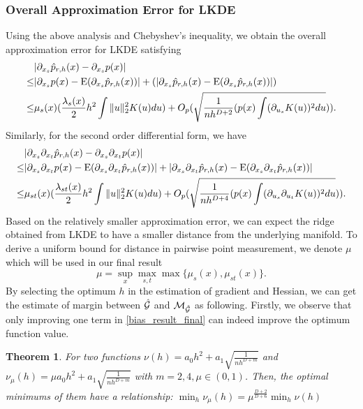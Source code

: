 \documentclass[aos,preprint]{imsart}
\newtheorem{theorem}{Theorem}[section]
\theoremstyle{remark}
\begin{document}
\subsubsection{Overall Approximation Error for LKDE}
Using the above analysis and Chebyshev's inequality, we obtain the overall approximation error for LKDE satisfying
\begin{equation}\label{bias_result_final}
\begin{aligned}
 &|\partial_{x_s} \hat{p}_{r,h}(x)-\partial_{x_s} p(x)|\\
 \leq & |\partial_{x_s} p(x) - {\rm E} (\partial_{x_s}\hat{p}_{r,h}(x)) |+(|\partial_{x_s} \hat{p}_{r,h}(x) - {\rm E} (\partial_{x_s}\hat{p}_{r,h}(x)) | )\\
 \leq & \mu_s(x)( \frac{ \lambda_s(x)}{2} h^2 \int \|u\|_2^2 K(u) du) + O_p(\sqrt{\frac{1}{n h^{D+2}}  (p(x) \int (\partial_{ u_s } K (u) )^2   du})).
\end{aligned}
\end{equation}
Similarly, for the second order differential form, we have
\[
\begin{aligned}
 &|\partial_{x_{s}}\partial_{x_t} \hat{p}_{r,h}(x)-\partial_{x_{s}}\partial_{x_t} p(x)|\\
 \leq & |\partial_{x_{s}}\partial_{x_t} p(x) - {\rm E} (\partial_{x_{s}}\partial_{x_t} \hat{p}_{r,h}(x)) |+|\partial_{x_{s}}\partial_{x_t} \hat{p}_{r,h}(x) - {\rm E} (\partial_{x_s} \partial_{x_t} \hat{p}_{r,h}(x)) | \\
 \leq & \mu_{st}(x)( \frac{ \lambda_{st}(x)}{2} h^2 \int \|u\|_2^2 K(u) du) + O_p(\sqrt{\frac{1}{n h^{D+4}}  (p(x) \int (\partial_{ u_s }\partial_{u_t} K (u) )^2   du})).
\end{aligned}
\]
Based on the relatively smaller approximation error, we can expect the ridge obtained from LKDE to have a smaller distance from the underlying manifold. To derive a uniform bound for distance in pairwise point measurement, we denote $\mu$ which will be used in our final result
\[
\mu = \sup_x \max_{s, t}\max\{\mu_s(x), \mu_{st}(x)\}.
\]
By selecting the optimum $h$ in the estimation of gradient and Hessian, we can get the estimate of margin between $\hat{\cal G}$ and $\cal M_{\hat{\cal G}}$ as following. Firstly, we observe that only improving one term in \eqref{bias_result_final} can indeed improve the optimum function value.
\begin{theorem}\label{improve_lemma}
For two functions $\nu(h) = a_0 h^2 + a_1 \sqrt{\frac{1}{nh^{D+m}}}$ and $\nu_\mu (h) = \mu a_0 h^2 + a_1 \sqrt{\frac{1}{nh^{D+m}}}$ with $m=2,4,\mu\in(0,1)$. Then, the optimal minimums of them have a relationship:  $\min_h \nu_\mu (h) = \mu^{\frac{D+2}{D+6}}\min_h \nu(h)$
\end{theorem} 
\end{document}
